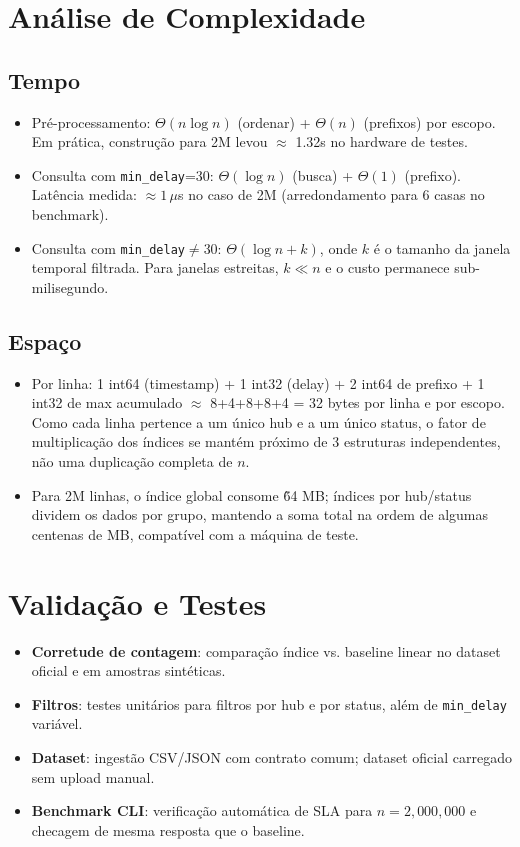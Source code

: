 \documentclass[12pt]{article}
\begin{document}
\section{Análise de Complexidade}
\subsection{Tempo}
\begin{itemize}
  \item Pré-processamento: $\Theta(n \log n)$ (ordenar) + $\Theta(n)$ (prefixos) por escopo. Em prática, construção para 2M levou $\approx$ 1.32s no hardware de testes.
  \item Consulta com \texttt{min\_delay}=30: $\Theta(\log n)$ (busca) + $\Theta(1)$ (prefixo). Latência medida: $\approx 1\,\mu$s no caso de 2M (arredondamento para 6 casas no benchmark).
  \item Consulta com \texttt{min\_delay}$\neq$30: $\Theta(\log n + k)$, onde $k$ é o tamanho da janela temporal filtrada. Para janelas estreitas, $k \ll n$ e o custo permanece sub-milisegundo.
\end{itemize}
\subsection{Espaço}
\begin{itemize}
  \item Por linha: 1 int64 (timestamp) + 1 int32 (delay) + 2 int64 de prefixo + 1 int32 de max acumulado $\approx$ 8+4+8+8+4 = 32 bytes por linha e por escopo. Como cada linha pertence a um único hub e a um único status, o fator de multiplicação dos índices se mantém próximo de 3 estruturas independentes, não uma duplicação completa de $n$.
  \item Para 2M linhas, o índice global consome \~64 MB; índices por hub/status dividem os dados por grupo, mantendo a soma total na ordem de algumas centenas de MB, compatível com a máquina de teste.
\end{itemize}

\section{Validação e Testes}
\begin{itemize}
  \item \textbf{Corretude de contagem}: comparação índice vs. baseline linear no dataset oficial e em amostras sintéticas.
  \item \textbf{Filtros}: testes unitários para filtros por hub e por status, além de \texttt{min\_delay} variável.
  \item \textbf{Dataset}: ingestão CSV/JSON com contrato comum; dataset oficial carregado sem upload manual.
  \item \textbf{Benchmark CLI}: verificação automática de SLA para $n=2{,}000{,}000$ e checagem de mesma resposta que o baseline.
\end{itemize}
\end{document}

